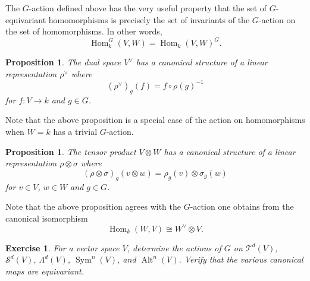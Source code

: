 \documentclass[12pt]{article}
\theoremstyle{plain}
\newtheorem{proposition}[theorem]{Proposition}
\newtheorem{exercise}[theorem]{Exercise}
\theoremstyle{definition}
\theoremstyle{remark}
\numberwithin{equation}{section}
\begin{document}
The $G$-action defined above has the very useful property that
the set of $G$-equivariant homomorphisms is precisely the set of invariants of the
$G$-action on the set of homomorphisms.  In other words,
\[
\operatorname{Hom}^G_k(V,W) = \operatorname{Hom}_k(V,W)^G .
\]

\begin{proposition}
The dual space $V^\vee$ has a canonical structure of a linear
representation $\rho^\vee$ where
\[
 (\rho^\vee)_g(f) = f \circ \rho(g)^{-1}
\]
for $f : V \to k$ and $g \in G$.
\end{proposition}

Note that the above proposition is a special case of the action on
homomorphisms when $W=k$ has a trivial $G$-action.

\begin{proposition}
The tensor product $V \otimes W$ has a canonical structure of a linear
representation $\rho \otimes \sigma$ where
\[
(\rho \otimes \sigma)_g(v \otimes w) = \rho_g(v) \otimes \sigma_g(w)
\]
for $v \in V$, $w \in W$ and $g \in G$.
\end{proposition}

Note that the above proposition agrees with the $G$-action one
obtains from the canonical isomorphism
\[
\operatorname{Hom}_k(W,V) \cong W^\vee \otimes V. 
\]

\begin{exercise}
For a vector space $V$,
determine the actions of $G$ on
$\mathcal{T}^d(V)$, $\mathcal{S}^d(V)$, $\Lambda^d(V)$,
$\operatorname{Sym}^n(V)$, and $\operatorname{Alt}^n(V)$.
Verify that the various canonical maps are equivariant.
\end{exercise}




\end{document}
